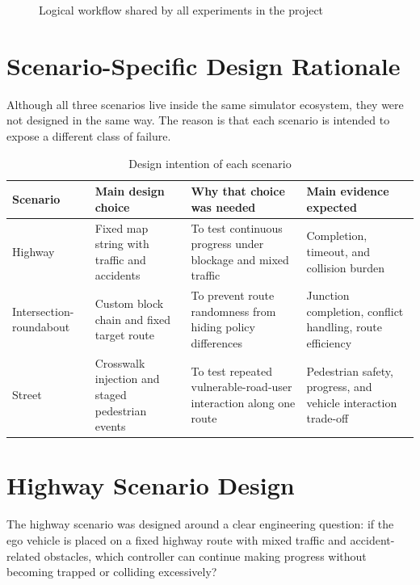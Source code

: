 \documentclass[12pt,a4paper]{report}
\begin{document}
\begin{figure}[H]
    \centering
    \caption{Logical workflow shared by all experiments in the project}
    \label{fig:workflow}
\end{figure}

\section{Scenario-Specific Design Rationale}
Although all three scenarios live inside the same simulator ecosystem, they were not designed in the same way. The reason is that each scenario is intended to expose a different class of failure.

\begin{table}[H]
    \centering
    \small
    \caption{Design intention of each scenario}
    \label{tab:design_intention}
    \begin{tabularx}{\textwidth}{>{\raggedright\arraybackslash}p{2.6cm} X X X}
        \toprule
        Scenario & Main design choice & Why that choice was needed & Main evidence expected \\
        \midrule
        Highway & Fixed map string with traffic and accidents & To test continuous progress under blockage and mixed traffic & Completion, timeout, and collision burden \\
        Intersection-roundabout & Custom block chain and fixed target route & To prevent route randomness from hiding policy differences & Junction completion, conflict handling, route efficiency \\
        Street & Crosswalk injection and staged pedestrian events & To test repeated vulnerable-road-user interaction along one route & Pedestrian safety, progress, and vehicle interaction trade-off \\
        \bottomrule
    \end{tabularx}
\end{table}

\section{Highway Scenario Design}
The highway scenario was designed around a clear engineering question: if the ego vehicle is placed on a fixed highway route with mixed traffic and accident-related obstacles, which controller can continue making progress without becoming trapped or colliding excessively?
\end{document}
